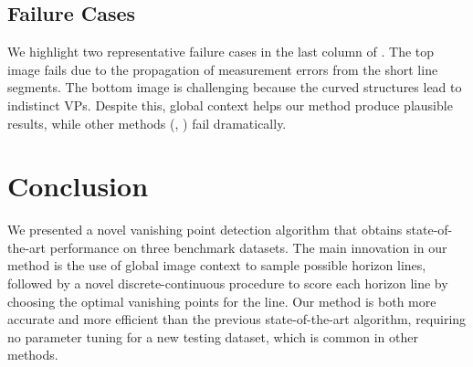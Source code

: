 \subsection{Failure Cases}

We highlight two representative failure cases in the last column of
.  The top image fails due to the propagation of
measurement errors from the short line segments. The bottom image is
challenging because the curved structures lead to indistinct VPs.
Despite this, global context helps our method produce plausible
results, while other methods (\eg, \cite{geoparser2010}) fail
dramatically.

\section{Conclusion}

We presented a novel vanishing point detection algorithm that obtains
state-of-the-art performance on three benchmark datasets. The main
innovation in our method is the use of global image context to sample
possible horizon lines, followed by a novel discrete-continuous
procedure to score each horizon line by choosing the optimal vanishing
points for the line. Our method is both more accurate and more
efficient than the previous state-of-the-art algorithm, requiring no
parameter tuning for a new testing dataset, which is common in other
methods.
